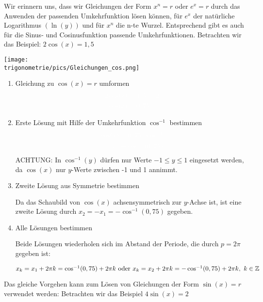 Wir erinnern uns, dass wir Gleichungen der Form \(x^n=r\) oder \(e^x=r\) durch das Anwenden der passenden Umkehrfunktion lösen können, für \(e^x\) der natürliche Logarithmus \(\left(\ln(y)\right)\) und für \(x^n\) die n-te Wurzel. Entsprechend gibt es auch für die Sinus- und Cosinusfunktion passende Umkehrfunktionen. Betrachten wir das Beispiel: \(2\cos(x)=1,5\)

\bigskip

\begin{minipage}{\textwidth}
	\texttt{[image: \\trigonometrie/pics/Gleichungen\_cos.png]}
\end{minipage}%

\bigskip

\begin{enumerate}
	\item Gleichung zu \(\cos(x)=r\) umformen
	\begin{align*}
		\textcolor{loes}{2\cos(x)}&\textcolor{loes}{\;=1,5\ \vert :2}\\
		\textcolor{loes}{\cos(x)}&\textcolor{loes}{\;=0,75}
	\end{align*}
	\item Erste Lösung mit Hilfe der Umkehrfunktion \(\cos^{-1}\) bestimmen
	\begin{align*}
		\textcolor{loes}{\cos(x)}&\textcolor{loes}{\;=0,75\ \vert \cos^{-1}}\\
		\textcolor{loes}{x_1}&\textcolor{loes}{\;=\cos^{-1}(0,75)}
	\end{align*}
	\textcolor{loes}{ACHTUNG: In \(\cos^{-1}(y)\) dürfen nur Werte \(-1\leq y \leq1\) eingesetzt werden, da \(\cos(x)\) nur \(y\)-Werte zwischen -1 und 1 annimmt.}
	\item Zweite Lösung aus Symmetrie bestimmen

	\textcolor{loes}{Da das Schaubild von \(\cos(x)\) achsensymmetrisch zur \(y\)-Achse ist, ist eine zweite Lösung durch \(x_2=-x_1=-\cos^{-1}(0,75)\) gegeben.}

    \vspace{1cm}

	\item Alle Lösungen bestimmen

	\textcolor{loes}{Beide Lösungen wiederholen sich im Abstand der Periode, die durch \(p=2\pi\) gegeben ist:}

	\textcolor{loes}{\(x_k=x_1+2\pi k=\cos^{-1}(0,75)+2\pi k\text{ oder } x_k=x_2+2\pi k=-\cos^{-1}(0,75)+2\pi k,\ k\in \mathbb{Z}\)}
\end{enumerate}
\newpage
Das gleiche Vorgehen kann zum Lösen von Gleichungen der Form \(\sin(x)=r\) verwendet werden: Betrachten wir das Beispiel \(4\sin(x)=2\)

